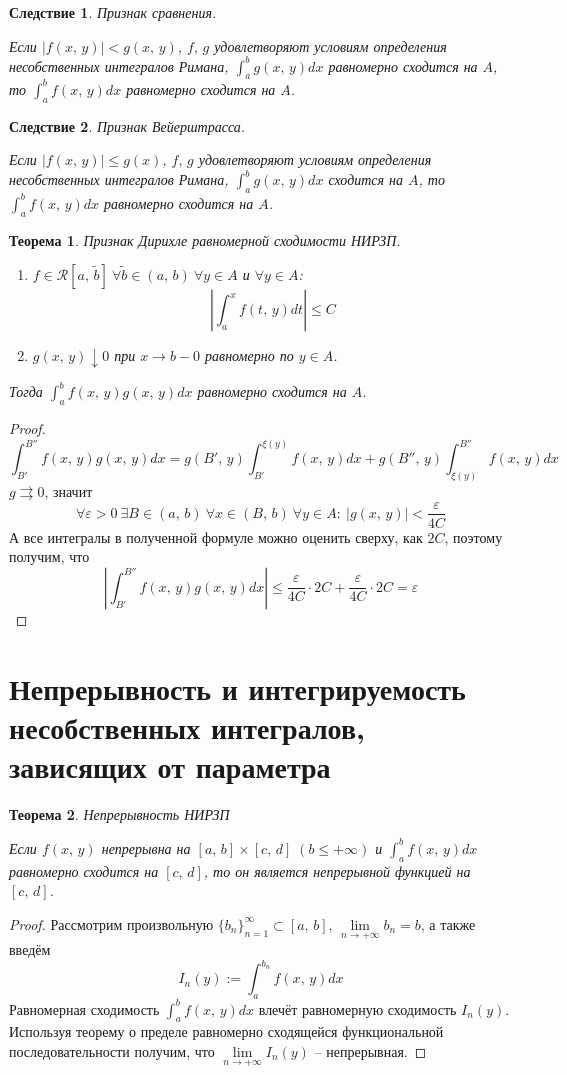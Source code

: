 \documentclass[a4paper,12pt]{article}
\renewcommand{\leq}{\ensuremath{\leqslant}}
\theoremstyle{plain}
\newtheorem{theorem}{Теорема}[section]
\newtheorem*{corollary}{Следствие}
\theoremstyle{definition}
\theoremstyle{remark}
\begin{document}
\begin{corollary}
	Признак сравнения.

	Если $|f(x,\,y)| < g(x,\,y)$, $f,\,g$ удовлетворяют условиям определения несобственных интегралов Римана, $\int_a^b g(x,\,y)dx$ равномерно сходится на $A$, то $\int_a^b f(x,\,y)dx$ равномерно сходится на $A$.
\end{corollary}

\begin{corollary}
	Признак Вейерштрасса.

	Если $|f(x,\,y)| \leq g(x)$, $f,\,g$ удовлетворяют условиям определения несобственных интегралов Римана, $\int_a^b g(x,\,y)dx$ сходится на $A$, то $\int_a^b f(x,\,y)dx$ равномерно сходится на $A$.
\end{corollary}

\begin{theorem}
	Признак Дирихле равномерной сходимости НИРЗП.

	\begin{enumerate}
		\item $f \in \mathcal{R}[a,\,\tilde{b}]\:\forall \tilde{b} \in (a,\,b) \: \forall y \in A$ и $\forall y \in A$:
		      \[\left|\int_a^x f(t,\,y)dt\right| \leq C\]
		\item $g(x,\,y) \downarrow 0$ при $x \to b - 0$ равномерно по $y \in A$.
	\end{enumerate}
	Тогда $\int_a^b f(x,\,y)g(x,\,y)dx$ равномерно сходится на $A$.
\end{theorem}
\begin{proof}
	\[\int_{B'}^{B''}f(x,\,y)g(x,\,y)dx = g(B',\,y)\int_{B'}^{\xi(y)}f(x,\,y)dx + g(B'',\,y)\int_{\xi(y)}^{B''}f(x,\,y)dx\]
	$g \rightrightarrows 0$, значит
	\[\forall \varepsilon > 0 \: \exists B \in (a,\,b) \: \forall x \in (B,\,b) \: \forall y \in A :\: |g(x,\,y)| < \frac{\varepsilon}{4C}\]
	А все интегралы в полученной формуле можно оценить сверху, как $2C$, поэтому получим, что
	\[\left|\int_{B'}^{B''}f(x,\,y)g(x,\,y)dx\right| \leq \frac{\varepsilon}{4C}\cdot 2C + \frac{\varepsilon}{4C}\cdot 2C = \varepsilon\]
\end{proof}

\section{Непрерывность и интегрируемость несобственных интегралов, зависящих от параметра}
\begin{theorem}
	Непрерывность НИРЗП

	Если $f(x,\,y)$ непрерывна на $[a,\,b] \times [c,\,d]\; (b \leq +\infty)$ и $\int_a^bf(x,\,y)dx$ равномерно сходится на $[c,\,d]$, то он является непрерывной функцией на $[c,\,d]$.
\end{theorem}
\begin{proof}
	Рассмотрим произвольную $\{b_n\}_{n = 1}^\infty \subset [a,\,b],\,\lim\limits_{n \to +\infty}b_n = b$, а также введём
	\[I_n(y) := \int_a^{b_n}f(x,\,y)dx\]
	Равномерная сходимость $\int_a^bf(x,\,y)dx$ влечёт равномерную сходимость $I_n(y)$. Используя теорему о пределе равномерно сходящейся функциональной последовательности получим, что $\lim\limits_{n \to +\infty} I_n(y)$ -- непрерывная.
\end{proof}
\end{document}
